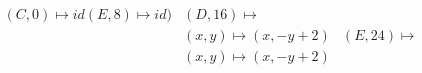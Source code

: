\documentclass[preview]{standalone}
\begin{document}
\begin{align*}
(C,0) \mapsto id (E,8) \mapsto id) &(D,16) \mapsto \\& (x,y) \mapsto (x, -y + 2) &(E,24) \mapsto \\& (x,y) \mapsto (x, -y + 2)
\end{align*}
\end{document}
